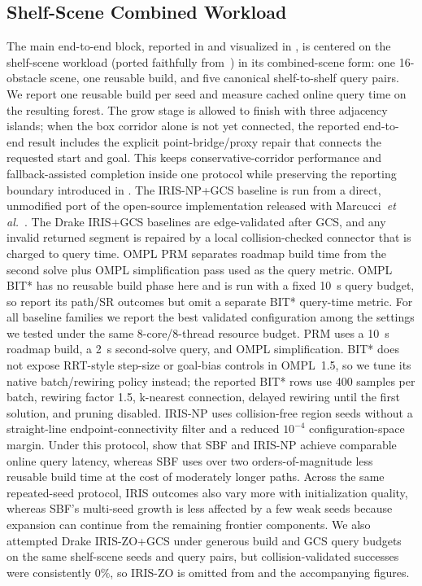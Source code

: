 \documentclass[journal]{IEEEtran}
\newcommand{\etal}{\textit{et al.}}
\begin{document}
\subsection{Shelf-Scene Combined Workload}\label{sec:exp_e2e}



The main end-to-end block, reported in  and visualized in
, is centered on the shelf-scene workload
(ported faithfully from~\cite{marcucci2023motion}) in its combined-scene form:
one 16-obstacle scene, one reusable build, and five canonical shelf-to-shelf
query pairs. We report one reusable build per seed and measure cached online
query time on the resulting forest. The grow stage is allowed to finish with
three adjacency islands; when the box corridor alone is not yet connected, the
reported end-to-end result includes the explicit point-bridge/proxy repair that
connects the requested start and goal. This keeps conservative-corridor
performance and fallback-assisted completion inside one protocol while
preserving the reporting boundary introduced in
. The IRIS-NP+GCS baseline is run from a direct,
unmodified port of the open-source implementation released with
Marcucci~\etal~\cite{marcucci2023motion}. The Drake IRIS+GCS baselines are edge-validated
after GCS, and any invalid returned segment is repaired by a local
collision-checked connector that is charged to query time. OMPL PRM separates
roadmap build time from the second solve plus OMPL simplification pass used as
the query metric. OMPL BIT* has no reusable build phase here and is run with a
fixed 10~s query budget, so 
report its path/SR outcomes but omit a separate BIT* query-time metric.
For all baseline families we report the best validated configuration among the
settings we tested under the same 8-core/8-thread resource budget. PRM uses a
10~s roadmap build, a 2~s second-solve query, and OMPL simplification. BIT*
does not expose RRT-style step-size or goal-bias controls in OMPL~1.5, so we
tune its native batch/rewiring policy instead; the reported BIT* rows use
400 samples per batch, rewiring factor 1.5, k-nearest connection, delayed
rewiring until the first solution, and pruning disabled. IRIS-NP uses
collision-free region seeds without a straight-line endpoint-connectivity
filter and a reduced $10^{-4}$ configuration-space margin.
Under this protocol,  show that SBF
and IRIS-NP achieve comparable online query latency, whereas SBF uses
over two orders-of-magnitude less reusable build time at the cost of moderately
longer paths. Across the same repeated-seed protocol, IRIS outcomes also vary
more with initialization quality, whereas SBF's multi-seed growth is less
affected by a few weak seeds because expansion can continue from the remaining
frontier components.
We also attempted Drake IRIS-ZO+GCS under generous build and GCS query budgets on the same shelf-scene seeds and query pairs, but collision-validated successes were consistently $0\%$, so IRIS-ZO is omitted from  and the accompanying figures.
\end{document}
